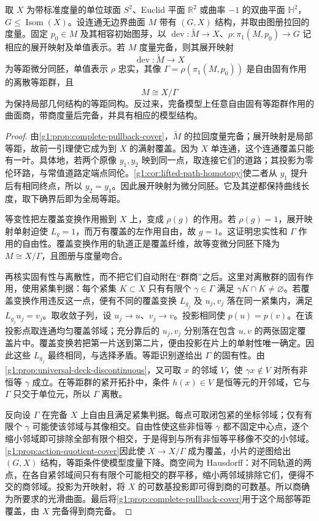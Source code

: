 \begin{theorem}
	\label{g1:thm:complete-model-quotient}
	取 \(X\) 为带标准度量的单位球面 \(S^2\)、Euclid 平面 \(\mathbb R^2\) 或曲率 \(-1\) 的双曲平面 \(\mathbb H^2\)，\(G\le\operatorname{Isom}(X)\)。设连通无边界曲面 \(M\) 带有 \((G,X)\) 结构，并取由图册拉回的度量。固定 \(p_0\in M\) 及其相容初始图芽，以 \(\operatorname{dev}:\widetilde M\to X\)、\(\rho:\pi_1(M,p_0)\to G\) 记相应的展开映射及单值表示。若 \(M\) 度量完备，则其展开映射
	\[
		\operatorname{dev}:\widetilde M\longrightarrow X
	\]
	为等距微分同胚，单值表示 \(\rho\) 忠实，其像 \(\Gamma=\rho(\pi_1(M,p_0))\) 是自由固有作用的离散等距群，且
	\[
		M\cong X/\Gamma
	\]
	为保持局部几何结构的等距同构。反过来，完备模型上任意自由固有等距群作用的曲面商，带商度量后完备，并具有相应的模型结构。
\end{theorem}
\begin{proof}
	由\cref{g1:prop:complete-pullback-cover}，\(\widetilde M\) 的拉回度量完备；展开映射是局部等距，故前一引理使它成为到 \(X\) 的满射覆盖。因为 \(X\) 单连通，这个连通覆盖只能有一叶。具体地，若两个原像 \(y_1,y_2\) 映到同一点，取连接它们的道路；其投影为零伦环路，与常值道路定端点同伦。\cref{g1:cor:lifted-path-homotopy}使二者从 \(y_1\) 提升后有相同终点，所以 \(y_2=y_1\)。因此展开映射为微分同胚。它及其逆都保持曲线长度，取下确界后即为全局等距。

	等变性把左覆盖变换作用搬到 \(X\) 上，变成 \(\rho(g)\) 的作用。若 \(\rho(g)=1\)，展开映射单射迫使 \(L_g=1\)，而万有覆盖的左作用自由，故 \(g=1\)。这证明忠实性和 \(\Gamma\) 作用的自由性。覆盖变换作用的轨道正是覆盖纤维，故等变微分同胚下降为 \(M\cong X/\Gamma\)，且图册与度量吻合。

	再核实固有性与离散性，而不把它们自动附在“群商”之后。这里对离散群的固有作用，使用紧集判据：每个紧集 \(K\subset X\) 只有有限个 \(\gamma\in\Gamma\) 满足 \(\gamma K\cap K\ne\varnothing\)。若覆盖变换作用违反这一点，便有不同的覆盖变换 \(L_{g_j}\) 及 \(u_j,v_j\) 落在同一紧集内，满足 \(L_{g_j}u_j=v_j\)。取收敛子列，设 \(u_j\to u\)、\(v_j\to v\)。投影相同使 \(p(u)=p(v)\)。在该投影点取连通均匀覆盖邻域；充分靠后的 \(u_j,v_j\) 分别落在包含 \(u,v\) 的两张固定覆盖片中。覆盖变换若把第一片送到第二片，便由投影在片上的单射性唯一确定。因此这些 \(L_{g_j}\) 最终相同，与选择矛盾。等距识别遂给出 \(\Gamma\) 的固有性。由\cref{g1:prop:universal-deck-discontinuous}，又可取 \(x\) 的邻域 \(V\)，使 \(\gamma x\notin V\) 对所有非恒等 \(\gamma\) 成立。在等距群的紧开拓扑中，条件 \(h(x)\in V\) 是恒等元的开邻域，它与 \(\Gamma\) 只交于单位元，所以 \(\Gamma\) 离散。

	反向设 \(\Gamma\) 在完备 \(X\) 上自由且满足紧集判据。每点可取闭包紧的坐标邻域；仅有有限个 \(\gamma\) 可能使该邻域与其像相交。自由性使这些非恒等 \(\gamma\) 都不固定中心点，逐个缩小邻域即可排除全部有限个相交，于是得到与所有非恒等平移像不交的小邻域。\cref{g1:prop:action-quotient-cover}因此使 \(X\to X/\Gamma\) 成为覆盖，小片的逆图给出 \((G,X)\) 结构，等距条件使模型度量下降。商空间为 Hausdorff：对不同轨道的两点，在各自紧邻域间只有有限个可能相交的群平移，缩小两邻域排除它们，便得不交的商邻域。投影为开映射，将 \(X\) 的可数基投影即可得到商的可数基。所以商确为所要求的光滑曲面。最后将\cref{g1:prop:complete-pullback-cover}用于这个局部等距覆盖，由 \(X\) 完备得到商完备。
\end{proof}

